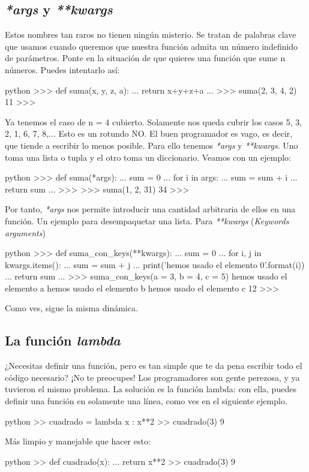 \documentclass{article}
\begin{document}
\subsection{\textit{*args} y \textit{**kwargs}}
Estos nombres tan raros no tienen ningún misterio. Se tratan de palabras clave que usamos cuando queremos que nuestra función admita un número indefinido de parámetros. Ponte en la situación de que quieres una función que sume n números. Puedes intentarlo así:
\begin{mintedbox}{python}
>>> def suma(x, y, z, a):
...     return x+y+z+a
... 
>>> suma(2, 3, 4, 2)
11
>>> 

\end{mintedbox}
Ya tenemos el caso de n = 4 cubierto. Solamente nos queda cubrir los casos  5, 3, 2, 1, 6, 7, 8,... Esto es un rotundo NO. El buen programador es vago, es decir, que tiende a escribir lo menos posible. Para ello tenemos \textit{*args} y \textit{**kwargs}. Uno toma una lista o tupla y el otro toma un diccionario. Veamos con un ejemplo:
\begin{mintedbox}{python}
>>> def suma(*args):
...     sum = 0
...     for i in args:
...             sum = sum + i
...     return sum
... 
>>> 
>>> suma(1, 2, 31)
34
>>> 

\end{mintedbox}
Por tanto, \textit{*args} nos permite introducir una cantidad arbitraria de ellos en una función. Un ejemplo para desempaquetar una lista. Para \textit{**kwargs} (\textit{Keywords arguments})
\begin{mintedbox}{python}
>>> def suma_con_keys(**kwargs):
...     sum = 0
...     for i, j in kwargs.items():
...             sum = sum + j
...             print('hemos usado el elemento {0}'.format(i))
...     return sum
... 
>>> suma_con_keys(a = 3, b = 4, c = 5)
hemos usado el elemento a
hemos usado el elemento b
hemos usado el elemento c
12
>>> 

\end{mintedbox}
Como ves, sigue la misma dinámica.
\subsection{La función \textit{lambda}}
¿Necesitas definir una función, pero es tan simple que te da pena escribir todo el código necesario? ¡No te preocupes! Los programadores son gente perezosa, y ya tuvieron el mismo problema. La solución es la función lambda: con ella, puedes definir una función en solamente una línea, como ves en el siguiente ejemplo.
\begin{mintedbox}{python}
>> cuadrado = lambda x : x**2
>> cuadrado(3)
9
\end{mintedbox}
Más limpio y manejable que hacer esto:
\begin{mintedbox}{python}
>> def cuadrado(x):
...     return x**2
>> cuadrado(3)
9
\end{mintedbox}
\end{document}
